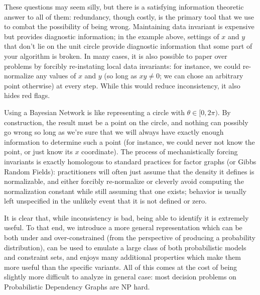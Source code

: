 \documentclass{article}
\newcommand{\modelname}{Probabilistic Dependency Graph}
\begin{document}
	These questions may seem silly, but there is a satisfying information theoretic answer to all of them: redundancy, though costly, is the primary tool that we use to combat the possibility of being wrong. Maintaining data invariant is expensive but provides diagnostic information; in the example above, settings of $x$ and $y$ that don't lie on the unit circle provide diagnostic information that some part of your algorithm is broken. In many cases, it is also possible to paper over problems by forcibly re-instating local data invariants: for instance, we could re-normalize any values of $x$ and $y$ (so long as $xy \neq 0$; we can chose an arbitrary point otherwise) at every step. While this would reduce inconsistency, it also hides red flags. 
	
	Using a Bayesian Network is like representing a circle with $\theta \in [0, 2\pi)$. By construction, the result must be a point on the circle, and nothing can possibly go wrong so long as we're sure that we will always have exactly enough information to determine such a point (for instance, we could never not know the point, or just know its $x$ coordinate). 
	The process of mechanistically forcing invariants is exactly homologous to standard practices for factor graphs (or Gibbs Random Fields): practitioners will often just assume that the density it defines is normalizable, and either forcibly re-normalize or cleverly avoid computing the normalization constant while still assuming that one exists; behavior is usually left unspecified in the unlikely event that it is not defined or zero. 
	
	It is clear that, while inconsistency is bad, being able to identify it is extremely useful. To that end, we introduce a more general representation which can be both under and over-constrained (from the perspective of producing a probability distribution), can be used to emulate a large class of both probabilistic models and constraint sets, and enjoys many additional properties which make them more useful than the specific variants. All of this comes at the cost of being slightly more difficult to analyze in general case: most decision problems on \modelname{}s are NP hard. %
	
\end{document}
